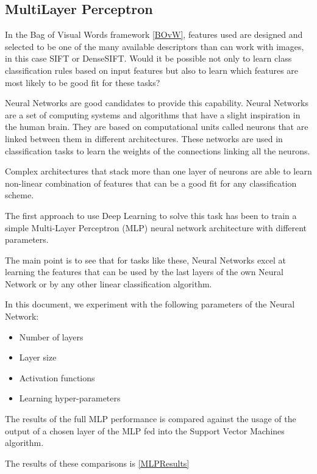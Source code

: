 \documentclass[runningheads]{llncs}
\begin{document}
\subsection{MultiLayer Perceptron}

In the Bag of Visual Words framework \ref{BOvW}, features used are designed and selected to be one of the many available descriptors than can work with images, in this case SIFT or DenseSIFT. Would it be possible not only to learn class classification rules based on input features but also to learn which features are most likely to be good fit for these tasks?

Neural Networks are good candidates to provide this capability. Neural Networks are a set of computing systems and algorithms that have a slight inspiration in the human brain. They are based on computational units called neurons that are linked between them in different architectures. These networks are used in classification tasks to learn the weights of the connections linking all the neurons.

Complex architectures that stack more than one layer of neurons are able to learn non-linear combination of features that can be a good fit for any classification scheme.

The first approach to use Deep Learning to solve this task has been to train a simple Multi-Layer Perceptron (MLP) neural network architecture with different parameters. 

The main point is to see that for tasks like these, Neural Networks excel at learning the features that can be used by the last layers of the own Neural Network or by any other linear classification algorithm.

In this document, we experiment with the following parameters of the Neural Network:

\begin{itemize}
	\item Number of layers
	\item Layer size
	\item Activation functions
	\item Learning hyper-parameters
\end{itemize}

The results of the full MLP performance is compared against the usage of the output of a chosen layer of the MLP fed into the Support Vector Machines algorithm.

The results of these comparisons is \ref{MLPResults}
\end{document}
